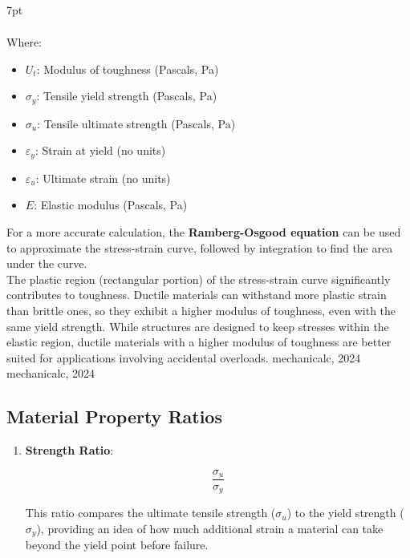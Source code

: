 \documentclass{article}
\newcommand{\formalsource}{} %
\newenvironment{formal}[1][]{%
    \renewcommand{\formalsource}{#1}%
    \def\FrameCommand{%
        \hspace{1pt}%
        {\color{gray}\vrule width 2pt}%
        {\color{white}\vrule width 4pt}%
        \colorbox{white}%
    }%
    \MakeFramed{\advance\hsize-\width\FrameRestore}%
    \noindent\hspace{-4.55pt}%
    \begin{adjustwidth}{}{7pt}%
        \vspace{2pt}%
    }%
    {%
        \vspace{4pt}%
        \ifx\formalsource\empty %
        \else
        \hfill{\footnotesize{\formalsource}}%
        \fi
    \end{adjustwidth}\endMakeFramed%
}
\begin{document}
{\begin{formal}[mechanicalc, 2024]
\begin{center}
\begin{minipage}{0.45\textwidth}
\begin{equation}
\begin{aligned}
            \end{aligned}
        \end{equation}
        Where:
        \begin{itemize}[left=0pt, itemsep=-1mm]
            \item \( U_t \): Modulus of toughness (Pascals, Pa)
            \item $\sigma_y$: Tensile yield strength (Pascals, Pa)
            \item $\sigma_u$: Tensile ultimate strength (Pascals, Pa)
            \item $\varepsilon_y$: Strain at yield (no units)
            \item $\varepsilon_u$: Ultimate strain (no units)
            \item $E$: Elastic modulus (Pascals, Pa)
        \end{itemize}
    \end{minipage}
\end{center}
For a more accurate calculation, the \textbf{Ramberg-Osgood equation} can be used to approximate the stress-strain curve, followed by integration to find the area under the curve.\\[8pt]
The plastic region (rectangular portion) of the stress-strain curve significantly contributes to toughness. Ductile materials can withstand more plastic strain than brittle ones, so they exhibit a higher modulus of toughness, even with the same yield strength. While structures are designed to keep stresses within the elastic region, ductile materials with a higher modulus of toughness are better suited for applications involving accidental overloads.
\end{formal}

\newpage

\subsection{Material Property Ratios}\label{mpr}
\vspace{0.5em}
\begin{enumerate}
    
    \item \textbf{Strength Ratio}:\\[8pt]
    \begin{minipage}{0.3\textwidth}
        \begin{equation}
            \frac{\sigma_u}{\sigma_y}
        \end{equation}
    \end{minipage}\hfill
    \begin{minipage}{0.6\textwidth}
        This ratio compares the ultimate tensile strength (\(\sigma_u\)) to the yield strength (\(\sigma_y\)), providing an idea of how much additional strain a material can take beyond the yield point before failure.
    \end{minipage}
    

\end{enumerate}}
\end{document}
